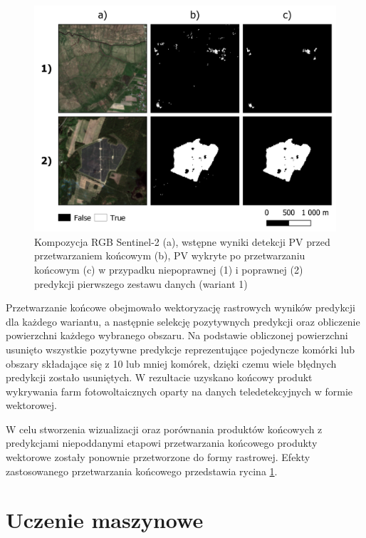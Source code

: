 \documentclass{amuthesis}
\begin{document}
\begin{figure}[t]

{\centering \includegraphics[width=1\textwidth,height=\textheight]{figures/postprocessing.png}

}

\caption{\label{fig-rycina-post-processing}Kompozycja RGB Sentinel-2
(a), wstępne wyniki detekcji PV przed przetwarzaniem końcowym (b), PV
wykryte po przetwarzaniu końcowym (c) w przypadku niepoprawnej (1) i
poprawnej (2) predykcji pierwszego zestawu danych (wariant 1)}

\end{figure}

Przetwarzanie końcowe obejmowało wektoryzację rastrowych wyników
predykcji dla każdego wariantu, a następnie selekcję pozytywnych
predykcji oraz obliczenie powierzchni każdego wybranego obszaru. Na
podstawie obliczonej powierzchni usunięto wszystkie pozytywne predykcje
reprezentujące pojedyncze komórki lub obszary składające się z 10 lub
mniej komórek, dzięki czemu wiele błędnych predykcji zostało usuniętych.
W rezultacie uzyskano końcowy produkt wykrywania farm fotowoltaicznych
oparty na danych teledetekcyjnych w formie wektorowej.

W celu stworzenia wizualizacji oraz porównania produktów końcowych z
predykcjami niepoddanymi etapowi przetwarzania końcowego produkty
wektorowe zostały ponownie przetworzone do formy rastrowej. Efekty
zastosowanego przetwarzania końcowego przedstawia rycina
\ref{fig-rycina-post-processing}.

\hypertarget{sec-machine-learning}{%
\section{Uczenie maszynowe}\label{sec-machine-learning}}
\end{document}

